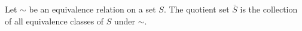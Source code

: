 Let $\sim$ be an equivalence relation on a set $S$. The quotient set $\bar{S}$ is the collection of all equivalence classes of $S$ under $\sim$.
